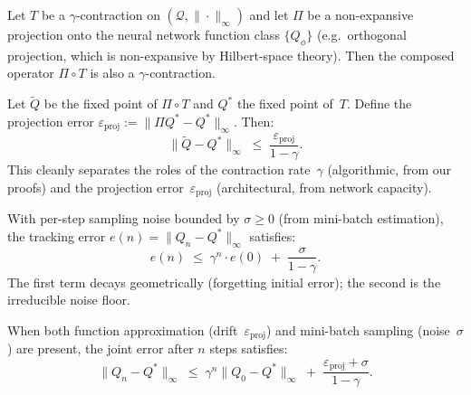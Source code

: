 \medskip
\begin{theorem}
\label{thm:proj_contraction}
Let $T$ be a $\gamma$-contraction on $(\mathcal{Q}, \|\cdot\|_\infty)$ and let $\Pi$ be a non-expansive projection onto the neural network function class $\{Q_\phi\}$ (e.g.\ orthogonal projection, which is non-expansive by Hilbert-space theory).  Then the composed operator $\Pi \circ T$ is also a $\gamma$-contraction.
\end{theorem}

\begin{theorem}
\label{thm:approx_bound}
Let $\tilde{Q}$ be the fixed point of $\Pi \circ T$ and $Q^*$ the fixed point of~$T$.  Define the projection error $\varepsilon_{\mathrm{proj}} := \|\Pi Q^* - Q^*\|_\infty$.  Then:
\begin{equation}
    \|\tilde{Q} - Q^*\|_\infty \;\le\; \frac{\varepsilon_{\mathrm{proj}}}{1 - \gamma}.
\end{equation}
This cleanly separates the roles of the contraction rate~$\gamma$ (algorithmic, from our proofs) and the projection error~$\varepsilon_{\mathrm{proj}}$ (architectural, from network capacity).
\end{theorem}

\begin{theorem}
\label{thm:stochastic_bound}
With per-step sampling noise bounded by $\sigma \ge 0$ (from mini-batch estimation), the tracking error $e(n) = \|Q_n - Q^*\|_\infty$ satisfies:
\begin{equation}
    e(n) \;\le\; \gamma^n \cdot e(0) \;+\; \frac{\sigma}{1 - \gamma}.
\end{equation}
The first term decays geometrically (forgetting initial error); the second is the irreducible noise floor.
\end{theorem}

\begin{corollary}
\label{cor:combined}
When both function approximation (drift~$\varepsilon_{\mathrm{proj}}$) and mini-batch sampling (noise~$\sigma$) are present, the joint error after $n$ steps satisfies:
\begin{equation}
    \|Q_n - Q^*\|_\infty \;\le\; \gamma^n \|Q_0 - Q^*\|_\infty \;+\; \frac{\varepsilon_{\mathrm{proj}} + \sigma}{1 - \gamma}.
\end{equation}
\end{corollary}

